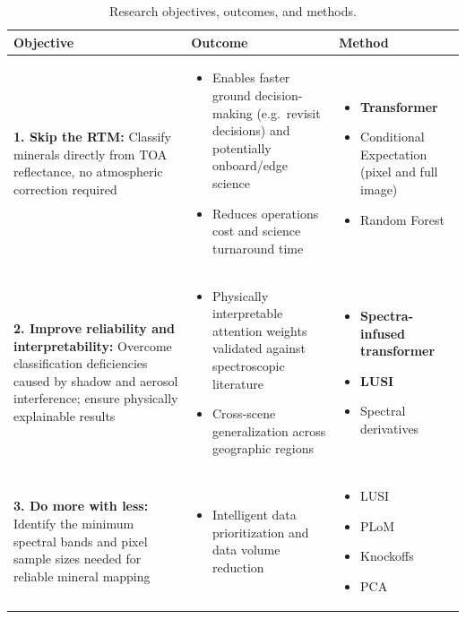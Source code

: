 \documentclass[11pt]{report}
\begin{document}
\begin{table}[htbp]
\centering
\caption{Research objectives, outcomes, and methods.}
\label{tab:objectives}
\renewcommand{\arraystretch}{1.4}
\begin{tabular}{p{}p{}p{}}
\hline
\textbf{Objective} & \textbf{Outcome} & \textbf{Method} \\
\hline
\textbf{1. Skip the RTM:} Classify minerals directly from TOA reflectance, no atmospheric correction required &
\begin{itemize}[nosep,leftmargin=*]
  \item Enables faster ground decision-making (e.g.\ revisit decisions) and potentially onboard/edge science
  \item Reduces operations cost and science turnaround time
\end{itemize} &
\begin{itemize}[nosep,leftmargin=*]
  \item \textbf{Transformer}
  \item Conditional Expectation (pixel and full image)
  \item Random Forest
\end{itemize} \\
\hline
\textbf{2. Improve reliability and interpretability:} Overcome classification deficiencies caused by shadow and aerosol interference; ensure physically explainable results &
\begin{itemize}[nosep,leftmargin=*]
  \item Physically interpretable attention weights validated against spectroscopic literature
  \item Cross-scene generalization across geographic regions
\end{itemize} &
\begin{itemize}[nosep,leftmargin=*]
  \item \textbf{Spectra-infused transformer}
  \item \textbf{LUSI}
  \item Spectral derivatives
\end{itemize} \\
\hline
\textbf{3. Do more with less:} Identify the minimum spectral bands and pixel sample sizes needed for reliable mineral mapping &
\begin{itemize}[nosep,leftmargin=*]
  \item Intelligent data prioritization and data volume reduction
\end{itemize} &
\begin{itemize}[nosep,leftmargin=*]
  \item LUSI
  \item PLoM
  \item Knockoffs
  \item PCA
\end{itemize} \\
\hline
\end{tabular}
\end{table}
\end{document}

